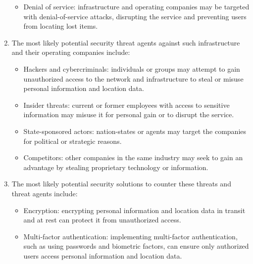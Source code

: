 \begin{enumerate}
\begin{itemize}
            \item Denial of service: infrastructure and operating companies may be targeted with denial-of-service attacks, disrupting the service and preventing users from locating lost items.
        \end{itemize}
    \item The most likely potential security threat agents against such infrastructure and their operating companies include:
        \begin{itemize}
            \item Hackers and cybercriminals: individuals or groups may attempt to gain unauthorized access to the network and infrastructure to steal or misuse personal information and location data.
            \item Insider threats: current or former employees with access to sensitive information may misuse it for personal gain or to disrupt the service.
            \item State-sponsored actors: nation-states or agents may target the companies for political or strategic reasons.
            \item Competitors: other companies in the same industry may seek to gain an advantage by stealing proprietary technology or information.
        \end{itemize}
    \item The most likely potential security solutions to counter these threats and threat agents include:
        \begin{itemize}
            \item Encryption: encrypting personal information and location data in transit and at rest can protect it from unauthorized access.
            \item Multi-factor authentication: implementing multi-factor authentication, such as using passwords and biometric factors, can ensure only authorized users access personal information and location data.
        \end{itemize}
\end{enumerate}